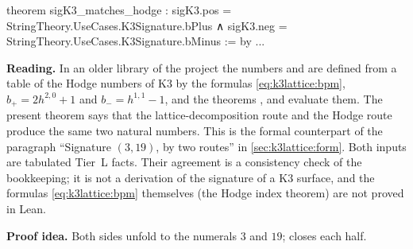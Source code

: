 \begin{leanbox}
\begin{leancode}
theorem sigK3_matches_hodge :
    sigK3.pos = StringTheory.UseCases.K3Signature.bPlus ∧
    sigK3.neg = StringTheory.UseCases.K3Signature.bMinus := by ...
\end{leancode}
\textbf{Reading.} In an older library of the project the numbers  and
 are defined from a table of the Hodge numbers of K3 by the formulas
\eqref{eq:k3lattice:bpm}, $b_+=2h^{2,0}+1$ and $b_-=h^{1,1}-1$, and the theorems
,  and
 evaluate them. The present theorem says that the
lattice-decomposition route and the Hodge route produce the same two natural numbers. This
is the formal counterpart of the paragraph ``Signature $(3,19)$, by two routes'' in
\cref{sec:k3lattice:form}. Both inputs are tabulated Tier~L facts. Their agreement is a
consistency check of the bookkeeping; it is not a derivation of the signature of a K3
surface, and the formulas \eqref{eq:k3lattice:bpm} themselves (the Hodge index theorem) are
not proved in Lean.

\textbf{Proof idea.} Both sides unfold to the numerals $3$ and $19$;  closes each
half.
\end{leanbox}

